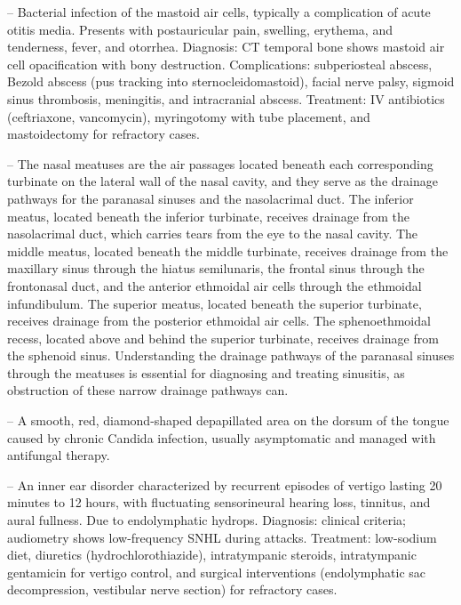 -- Bacterial infection of the mastoid air cells, typically a complication of acute otitis media. Presents with postauricular pain, swelling, erythema, and tenderness, fever, and otorrhea. Diagnosis: CT temporal bone shows mastoid air cell opacification with bony destruction. Complications: subperiosteal abscess, Bezold abscess (pus tracking into sternocleidomastoid), facial nerve palsy, sigmoid sinus thrombosis, meningitis, and intracranial abscess. Treatment: IV antibiotics (ceftriaxone, vancomycin), myringotomy with tube placement, and mastoidectomy for refractory cases.

-- The nasal meatuses are the air passages located beneath each corresponding turbinate on the lateral wall of the nasal cavity, and they serve as the drainage pathways for the paranasal sinuses and the nasolacrimal duct. The inferior meatus, located beneath the inferior turbinate, receives drainage from the nasolacrimal duct, which carries tears from the eye to the nasal cavity. The middle meatus, located beneath the middle turbinate, receives drainage from the maxillary sinus through the hiatus semilunaris, the frontal sinus through the frontonasal duct, and the anterior ethmoidal air cells through the ethmoidal infundibulum. The superior meatus, located beneath the superior turbinate, receives drainage from the posterior ethmoidal air cells. The sphenoethmoidal recess, located above and behind the superior turbinate, receives drainage from the sphenoid sinus. Understanding the drainage pathways of the paranasal sinuses through the meatuses is essential for diagnosing and treating sinusitis, as obstruction of these narrow drainage pathways can.

-- A smooth, red, diamond-shaped depapillated area on the dorsum of the tongue caused by chronic Candida infection, usually asymptomatic and managed with antifungal therapy.

-- An inner ear disorder characterized by recurrent episodes of vertigo lasting 20 minutes to 12 hours, with fluctuating sensorineural hearing loss, tinnitus, and aural fullness. Due to endolymphatic hydrops. Diagnosis: clinical criteria; audiometry shows low-frequency SNHL during attacks. Treatment: low-sodium diet, diuretics (hydrochlorothiazide), intratympanic steroids, intratympanic gentamicin for vertigo control, and surgical interventions (endolymphatic sac decompression, vestibular nerve section) for refractory cases.

